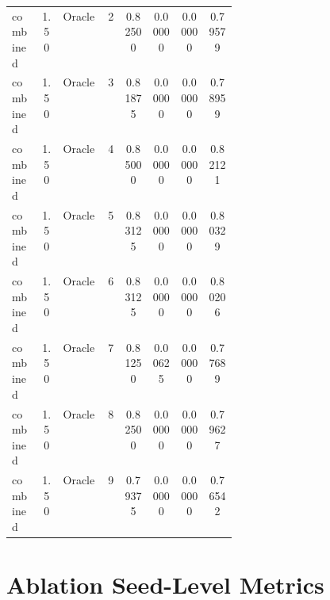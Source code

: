 \documentclass{article}
\begin{document}
\begin{center}
\begin{longtable}{p{0.13\linewidth}cp{0.20\linewidth}ccccc}
combined & 1.50 & Oracle & 2 & 0.82500 & 0.00000 & 0.00000 & 0.79579\\
combined & 1.50 & Oracle & 3 & 0.81875 & 0.00000 & 0.00000 & 0.78959\\
combined & 1.50 & Oracle & 4 & 0.85000 & 0.00000 & 0.00000 & 0.82121\\
combined & 1.50 & Oracle & 5 & 0.83125 & 0.00000 & 0.00000 & 0.80329\\
combined & 1.50 & Oracle & 6 & 0.83125 & 0.00000 & 0.00000 & 0.80206\\
combined & 1.50 & Oracle & 7 & 0.81250 & 0.00625 & 0.00000 & 0.77689\\
combined & 1.50 & Oracle & 8 & 0.82500 & 0.00000 & 0.00000 & 0.79627\\
combined & 1.50 & Oracle & 9 & 0.79375 & 0.00000 & 0.00000 & 0.76542\\
\bottomrule
\end{longtable}
\normalsize
\end{center}

\section{Ablation Seed-Level Metrics}
\end{document}
